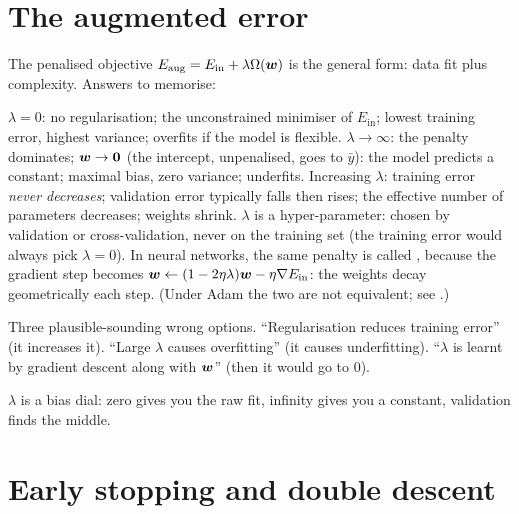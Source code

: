 \section{The augmented error}

The penalised objective $E_{\text{aug}}=E_{\text{in}}+\lambda\Omega({\bm{w}})$ is the general form: data
fit plus complexity. Answers to memorise:
\begin{itemize}
	\ii $\lambda=0$: no regularisation; the unconstrained minimiser of $E_{\text{in}}$; lowest
	training error, highest variance; overfits if the model is flexible.
	\ii $\lambda\to\infty$: the penalty dominates; ${\bm{w}}\to{\bm{0}}$ (the intercept, unpenalised,
	goes to $\bar y$): the model predicts a constant; maximal bias, zero variance; underfits.
	\ii Increasing $\lambda$: training error \emph{never decreases}; validation error typically falls
	then rises; the effective number of parameters decreases; weights shrink.
	\ii $\lambda$ is a hyper-parameter: chosen by validation or cross-validation, never on the
	training set (the training error would always pick $\lambda=0$).
	\ii In neural networks, the same penalty is called , because the gradient
	step becomes ${\bm{w}}\leftarrow(1-2\eta\lambda){\bm{w}}-\eta\nabla E_{\text{in}}$: the weights decay
	geometrically each step. (Under Adam the two are not equivalent; see .)
\end{itemize}

\begin{remark}
	\trap Three plausible-sounding wrong options. ``Regularisation reduces training error'' (it
	increases it). ``Large $\lambda$ causes overfitting'' (it causes underfitting). ``$\lambda$ is
	learnt by gradient descent along with ${\bm{w}}$'' (then it would go to $0$).
\end{remark}

\begin{moral}
	$\lambda$ is a bias dial: zero gives you the raw fit, infinity gives you a constant, validation
	finds the middle.
\end{moral}

\section{Early stopping and double descent}

